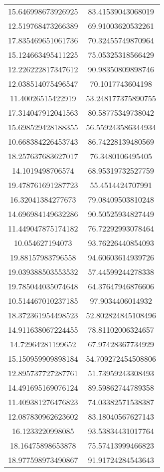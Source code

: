 \begin{table}
\begin{tabular}{cc}
15.646998673926925 & 83.41539043068019 \\
12.519768473266389 & 69.91003620532261 \\
17.835469651061736 & 70.32455749870964 \\
15.124663495411225 & 75.05325318566429 \\
12.226222817347612 & 90.98350809898746 \\
12.038514075496547 & 70.1017743604198 \\
11.40026515422919 & 53.248177375890755 \\
17.314047912041563 & 80.58775349738042 \\
15.698529428188355 & 56.559243586344934 \\
10.668384226453743 & 86.74228139480569 \\
18.257637683627017 & 76.3480106495405 \\
14.1019498706574 & 68.95319732527759 \\
19.478761691287723 & 55.4514424707991 \\
16.32041384277673 & 79.08409503810248 \\
14.696984149632286 & 90.50525934827449 \\
11.449047875174182 & 76.72292993078464 \\
10.054627194073 & 93.76226440854093 \\
19.88157983796558 & 94.60603614939726 \\
19.039388503553532 & 57.44599244278338 \\
19.785044035074648 & 64.37647946876606 \\
10.514467010237185 & 97.9034406014932 \\
18.372361954498523 & 52.802824845108496 \\
14.911638067224455 & 78.81102006324657 \\
14.72964281199652 & 67.97428367734929 \\
15.150959909898184 & 54.709272454508806 \\
12.895737727287761 & 51.73959243308493 \\
14.491695169076124 & 89.59862744789358 \\
11.409381276476823 & 74.03382571538387 \\
12.087830962623602 & 83.18040567627143 \\
16.1233220998085 & 93.53834431017764 \\
18.16475898653878 & 75.57413999466823 \\
18.977598973490867 & 91.91724284543643 \\

\end{tabular}
\end{table}
